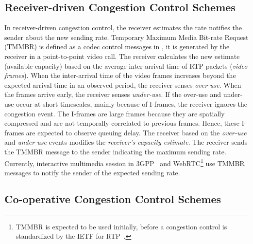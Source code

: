 \subsection{Receiver-driven Congestion Control Schemes}

In receiver-driven congestion control, the receiver estimates the rate
notifies the sender about the new sending rate. Temporary Maximum Media
Bit-rate Request (TMMBR) is defined as a codec control messages in
\cite{rfc5104}, it is generated by the receiver in a point-to-point video
call. The receiver calculates the new estimate (available capacity) based on
the average inter-arrival time of RTP packets (\emph{video frames}). When the
inter-arrival time of the video frames increases beyond the expected arrival
time in an observed period, the receiver senses \emph{over-use}. When the
frames arrive early, the receiver senses \emph{under-use}. If the over-use and
under-use occur at short timescales, mainly because of I-frames, the receiver
ignores the congestion event. The I-frames are large frames because they are
spatially compressed and are not temporally correlated to previous frames.
Hence, these I-frames are expected to observe queuing delay. The receiver
based on the \emph{over-use} and \emph{under-use} events modifies the
\emph{receiver's capacity estimate}. The receiver sends the TMMBR message to
the sender indicating the maximum sending rate. Currently, interactive
multimedia session in 3GPP~\cite{3gpp.26.114} and WebRTC\footnote{TMMBR is
expected to be used initially, before a congestion control is standardized by
the IETF for RTP~\cite{rtp-usage}.} use TMMBR messages to notify the sender of
the expected sending rate.

\subsection{Co-operative Congestion Control Schemes}
\label{cc:co-op}

